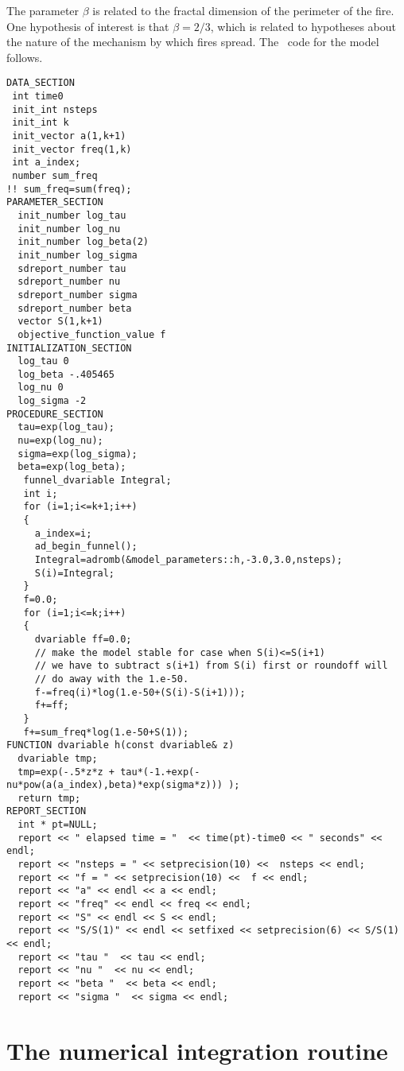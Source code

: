 \documentclass{admbmanual}
\begin{document}
The parameter $\beta$ is related to the fractal dimension of the perimeter of
the fire. One hypothesis of interest is that $\beta =2/3$, which is related to
hypotheses about the nature of the mechanism by which fires spread. The \ADM\
code for the model follows.
\begin{lstlisting}
DATA_SECTION
 int time0
 init_int nsteps
 init_int k
 init_vector a(1,k+1)
 init_vector freq(1,k)
 int a_index;
 number sum_freq
!! sum_freq=sum(freq);
PARAMETER_SECTION
  init_number log_tau
  init_number log_nu
  init_number log_beta(2)
  init_number log_sigma
  sdreport_number tau
  sdreport_number nu
  sdreport_number sigma
  sdreport_number beta
  vector S(1,k+1)
  objective_function_value f
INITIALIZATION_SECTION
  log_tau 0
  log_beta -.405465
  log_nu 0
  log_sigma -2
PROCEDURE_SECTION
  tau=exp(log_tau);
  nu=exp(log_nu);
  sigma=exp(log_sigma);
  beta=exp(log_beta);
   funnel_dvariable Integral;
   int i;
   for (i=1;i<=k+1;i++)
   {
     a_index=i;
     ad_begin_funnel();
     Integral=adromb(&model_parameters::h,-3.0,3.0,nsteps);
     S(i)=Integral;
   }
   f=0.0;
   for (i=1;i<=k;i++)
   {
     dvariable ff=0.0;
     // make the model stable for case when S(i)<=S(i+1)
     // we have to subtract s(i+1) from S(i) first or roundoff will
     // do away with the 1.e-50.
     f-=freq(i)*log(1.e-50+(S(i)-S(i+1)));
     f+=ff;
   }
   f+=sum_freq*log(1.e-50+S(1));
FUNCTION dvariable h(const dvariable& z)
  dvariable tmp;
  tmp=exp(-.5*z*z + tau*(-1.+exp(-nu*pow(a(a_index),beta)*exp(sigma*z))) );
  return tmp;
REPORT_SECTION
  int * pt=NULL;
  report << " elapsed time = "  << time(pt)-time0 << " seconds" << endl;
  report << "nsteps = " << setprecision(10) <<  nsteps << endl;
  report << "f = " << setprecision(10) <<  f << endl;
  report << "a" << endl << a << endl;
  report << "freq" << endl << freq << endl;
  report << "S" << endl << S << endl;
  report << "S/S(1)" << endl << setfixed << setprecision(6) << S/S(1) << endl;
  report << "tau "  << tau << endl;
  report << "nu "  << nu << endl;
  report << "beta "  << beta << endl;
  report << "sigma "  << sigma << endl;
\end{lstlisting}

\section{The numerical integration routine}
\end{document}
